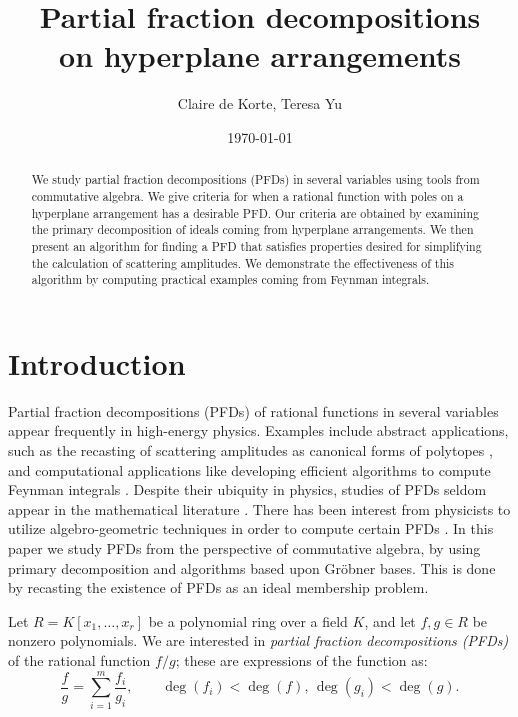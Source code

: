 \documentclass [a4paper,reqno, 11pt]{amsart}
\title{Partial fraction decompositions\\ on hyperplane arrangements}
\author{Claire de Korte, Teresa Yu}
\date{\today}
\theoremstyle{plain}
\theoremstyle{plain}
\theoremstyle{plain}
\theoremstyle{plain}
\theoremstyle{definition}
\theoremstyle{definition}
\theoremstyle{definition}
\theoremstyle{definition}
\theoremstyle{definition}
\theoremstyle{definition}
\begin{document}
\begin{abstract}
    We study partial fraction decompositions (PFDs) in several variables using tools from commutative algebra. We give criteria for when a rational function with poles on a hyperplane arrangement has a desirable PFD. Our criteria are obtained by examining the primary decomposition of ideals coming from hyperplane arrangements.
    We then present an algorithm for finding a PFD that satisfies properties desired for simplifying the calculation of scattering amplitudes. We demonstrate the effectiveness of this algorithm by computing practical examples coming from Feynman integrals.
\end{abstract}

\maketitle

\section{Introduction}\label{sec:intro}




Partial fraction decompositions (PFDs) of rational functions in several variables appear frequently in high-energy physics. Examples include abstract applications, such as the recasting of scattering amplitudes as canonical forms of polytopes \cite{ABL}, and computational applications like developing efficient algorithms to compute Feynman integrals \cite{HvM}. Despite their ubiquity in physics, studies of PFDs seldom appear in the mathematical literature \cite{BBD+,Bec,Lei}. There has been interest from physicists to utilize algebro-geometric techniques in order to compute certain PFDs \cite{BWW+,CDE,DP}.
In this paper we study PFDs from the perspective of commutative algebra, by using primary decomposition and algorithms based upon Gr\"obner bases. This is done by recasting the existence of PFDs as an ideal membership problem.


Let $R=K[x_1,\ldots,x_r]$ be a polynomial ring over a field $K$, and let $f,g\in R$ be nonzero polynomials. We are interested in \emph{partial fraction decompositions (PFDs)} of the rational function $f/g$; these are expressions of the function as:
\begin{equation*}
        \frac{f}{g}=\sum_{i=1}^m\frac{f_i}{g_i},\qquad \deg(f_i)<\deg(f),\,\deg(g_i)<\deg(g).
    \end{equation*}
\end{document}
